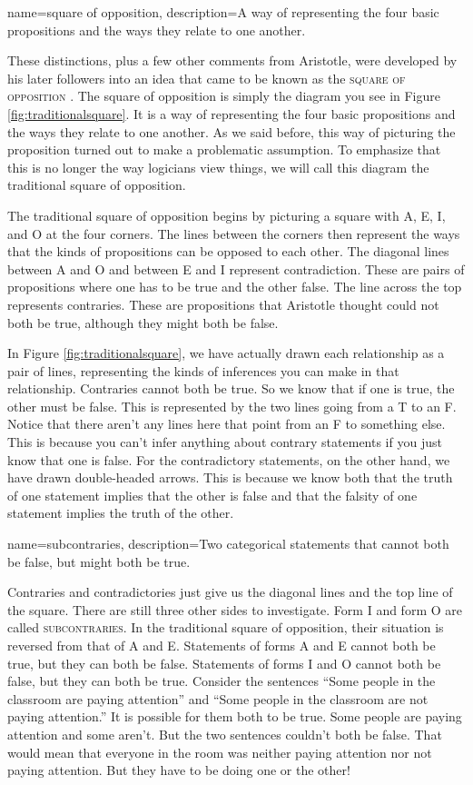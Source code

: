 {
name=square of opposition,
description={A way of representing the four basic propositions and the ways they relate to one another.}
}


These distinctions, plus a few other comments from Aristotle, were developed by his later followers into an idea that came to be known as the \textsc{\gls{square of opposition}} \label{def:Squareofopposition}. The square of opposition is simply the diagram you see in Figure \ref{fig:traditionalsquare}. It is a way of representing the four basic propositions and the ways they relate to one another.  As we said before, this way of picturing the proposition turned out to make a problematic assumption. To emphasize that this is no longer the way logicians view things, we will call this diagram the traditional square of opposition.

The traditional square of opposition begins by picturing a square with A, E, I, and O at the four corners. The lines between the corners then represent the ways that the kinds of propositions can be opposed to each other. The diagonal lines between A and O and between E and I represent contradiction. These are pairs of propositions where one has to be true and the other false. The line across the top represents contraries. These are propositions that Aristotle thought could not both be true, although they might both be false.

In Figure \ref{fig:traditionalsquare}, we have actually drawn each relationship as a pair of lines, representing the kinds of inferences you can make in that relationship. Contraries cannot both be true. So we know that if one is true, the other must be false. This is represented by the two lines going from a T to an F. Notice that there aren't any lines here that point from an F to something else. This is because you can't infer anything about contrary statements if you just know that one is false. For the contradictory statements, on the other hand, we have drawn double-headed arrows. This is because we know both that the truth of one statement implies that the other is false and that the falsity of one statement implies the truth of the other.

{
name=subcontraries,
description={Two categorical statements that cannot both be false, but might both be true.}
}

Contraries and contradictories just give us the diagonal lines and the top line of the square. There are still three other sides to investigate. Form I and form O are called \textsc{\gls{subcontraries}}. \label{defSubcontraries} In the traditional square of opposition, their situation is reversed from that of A and E. Statements of forms A and E cannot both be true, but they can both be false. Statements of forms I and O cannot both be false, but they can both be true. Consider the sentences ``Some people in the classroom are paying attention'' and ``Some people in the classroom are not paying attention.'' It is possible for them both to be true. Some people are paying attention and some aren't. But the two sentences couldn't both be false. That would mean that everyone in the room was neither paying attention nor not paying attention. But they have to be doing one or the other!

